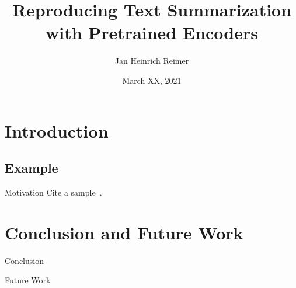\documentclass[english]{mlutalk}
\title{Reproducing Text Summarization with Pretrained Encoders}
\author{Jan Heinrich Reimer}
\institute{Martin Luther University Halle-Wittenberg}
\date{March XX, 2021}
\begin{document}
\titleframe

\section{Introduction}

\subsection{Example}

\begin{frame}{Motivation}
    Cite a sample~\cite{Lin2004}.
\end{frame}

\section*{Conclusion and Future Work}

\begin{frame}{Conclusion}
\end{frame}

\begin{frame}{Future Work}
    \thankyou
\end{frame}

\appendix
\section{\appendixname}

\bibliographyframe
\end{document}

